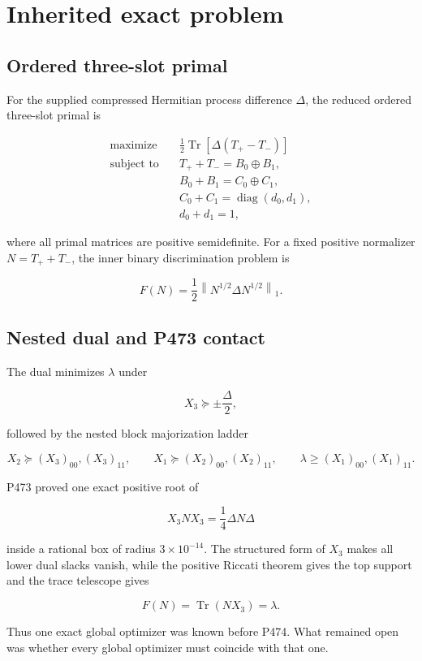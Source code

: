 \documentclass[11pt,a4paper,openany]{report}
\begin{document}
\chapter{Inherited exact problem}

\section{Ordered three-slot primal}

For the supplied compressed Hermitian process difference \(\Delta\), the reduced ordered three-slot primal is

\[
\begin{aligned}
\operatorname{maximize}\quad&
\frac12\operatorname{Tr}[\Delta(T_+-T_-)]\\
\operatorname{subject\ to}\quad&
T_++T_-=B_0\oplus B_1,\\
&B_0+B_1=C_0\oplus C_1,\\
&C_0+C_1=\operatorname{diag}(d_0,d_1),\\
&d_0+d_1=1,
\end{aligned}
\]

where all primal matrices are positive semidefinite. For a fixed positive normalizer \(N=T_++T_-\), the inner binary discrimination problem is

\[
F(N)=\frac12\left\|N^{1/2}\Delta N^{1/2}\right\|_1.
\]

\section{Nested dual and P473 contact}

The dual minimizes \(\lambda\) under

\[
X_3\succeq\pm\frac{\Delta}{2},
\]

followed by the nested block majorization ladder

\[
X_2\succeq (X_3)_{00},(X_3)_{11},\qquad
X_1\succeq (X_2)_{00},(X_2)_{11},\qquad
\lambda\ge (X_1)_{00},(X_1)_{11}.
\]

P473 proved one exact positive root of

\[
X_3NX_3=\frac14\Delta N\Delta
\]

inside a rational box of radius \(3\times10^{-14}\). The structured form of \(X_3\) makes all lower dual slacks vanish, while the positive Riccati theorem gives the top support and the trace telescope gives

\[
F(N)=\operatorname{Tr}(NX_3)=\lambda.
\]

Thus one exact global optimizer was known before P474. What remained open was whether every global optimizer must coincide with that one.
\end{document}
